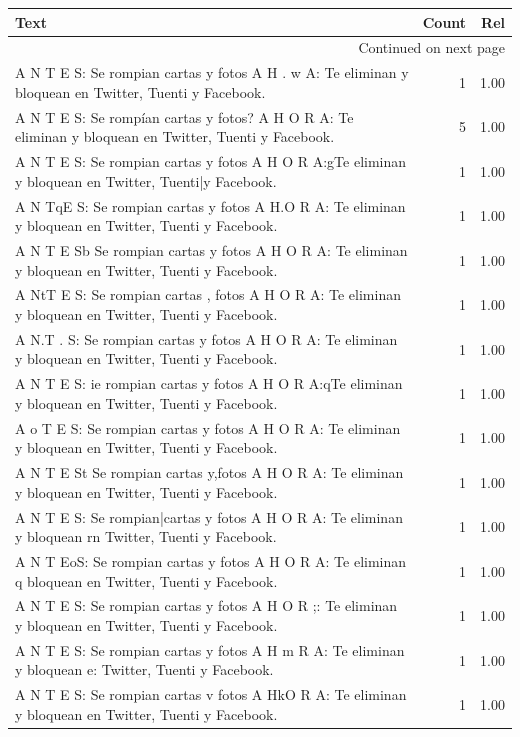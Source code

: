 \begin{longtable}{p{12.5cm}rr}
\toprule
Text & Count & Rel \\
\midrule
\endhead
\midrule
\multicolumn{3}{r}{{Continued on next page}} \\
\midrule
\endfoot

\bottomrule
\endlastfoot
A N T E S: Se rompian cartas y fotos A H . w A: Te eliminan y bloquean en Twitter, Tuenti y Facebook. & 1 & 1.00 \\
A N T E S: Se rompían cartas y fotos? A H O R A: Te eliminan y bloquean en Twitter, Tuenti y Facebook. & 5 & 1.00 \\
A N T E S: Se rompian cartas y fotos A H O R A:gTe eliminan y bloquean en Twitter, Tuenti|y Facebook. & 1 & 1.00 \\
A N TqE S: Se rompian cartas y fotos A H.O R A: Te eliminan y bloquean en Twitter, Tuenti y Facebook. & 1 & 1.00 \\
A N T E Sb Se rompian cartas y fotos A H O R A: Te eliminan y bloquean en Twitter, Tuenti y Facebook. & 1 & 1.00 \\
A NtT E S: Se rompian cartas , fotos A H O R A: Te eliminan y bloquean en Twitter, Tuenti y Facebook. & 1 & 1.00 \\
A N.T . S: Se rompian cartas y fotos A H O R A: Te eliminan y bloquean en Twitter, Tuenti y Facebook. & 1 & 1.00 \\
A N T E S: ie rompian cartas y fotos A H O R A:qTe eliminan y bloquean en Twitter, Tuenti y Facebook. & 1 & 1.00 \\
A o T E S: Se rompian cartas y fotos A H O R A: Te eliminan y bloquean en Twitter, Tuenti y Facebook. & 1 & 1.00 \\
A N T E St Se rompian cartas y,fotos A H O R A: Te eliminan y bloquean en Twitter, Tuenti y Facebook. & 1 & 1.00 \\
A N T E S: Se rompian|cartas y fotos A H O R A: Te eliminan y bloquean rn Twitter, Tuenti y Facebook. & 1 & 1.00 \\
A N T EoS: Se rompian cartas y fotos A H O R A: Te eliminan q bloquean en Twitter, Tuenti y Facebook. & 1 & 1.00 \\
A N T E S: Se rompian cartas y fotos A H O R ;: Te eliminan y bloquean en Twitter, Tuenti y Facebook. & 1 & 1.00 \\
A N T E S: Se rompian cartas y fotos A H m R A: Te eliminan y bloquean e: Twitter, Tuenti y Facebook. & 1 & 1.00 \\
A N T E S: Se rompian cartas v fotos A HkO R A: Te eliminan y bloquean en Twitter, Tuenti y Facebook. & 1 & 1.00 \\

\end{longtable}
